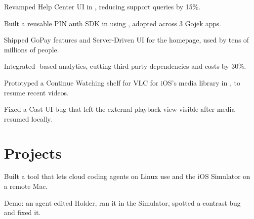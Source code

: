 \documentclass{fonts}
\begin{document}
\textbf{\href{https://www.gojek.io/}{}} 
\begin{tightemize}
\item Revamped Help Center UI in , reducing support queries by 15\%.
\item Built a reusable PIN auth SDK in  using , adopted across 3 Gojek apps.
\item Shipped GoPay  features and Server-Driven UI for the homepage, used by tens of millions of people.
\item Integrated -based analytics, cutting third-party dependencies and costs by 30\%.
\end{tightemize}

\textbf{\href{https://summerofcode.withgoogle.com/archive/2021/projects/5007392080658432}{}}
\begin{tightemize}
  \item Prototyped a Continue Watching shelf for VLC for iOS's media library in , to resume recent videos.
    \item Fixed a Cast UI bug that left the external playback view visible after media resumed locally.
\end{tightemize}


\section{Projects}

\textbf{\href{https://www.linkedin.com/feed/update/urn:li:activity:7508661721595691008/}{}}
\begin{tightemize}
    \item Built a tool that lets cloud coding agents on Linux use  and the iOS Simulator on a remote Mac.
    \item Demo: an agent edited Holder, ran it in the Simulator, spotted a contrast bug and fixed it.
\end{tightemize}
\end{document}

